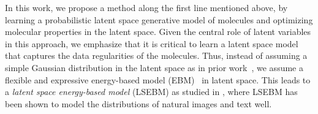\documentclass[accepted]{uai2023} %
\begin{document}
In this work, we propose a method along the first line mentioned above, by learning a probabilistic latent space generative model of molecules and optimizing molecular properties in the latent space. Given the central role of latent variables in this approach, we emphasize that it is critical to learn a latent space model that captures the data regularities of the molecules. Thus, instead of assuming a simple Gaussian distribution in the latent space as in prior work~\citep{gomez2018automatic, jin2018junction}, we assume a flexible and expressive energy-based model (EBM)~\citep{lecun2006tutorial,ngiam2011learning,kim2016deep,xie2016theory,kumar2019maximum,nijkamp2019learning,du2019implicit,grathwohl2019your,finn2016connection} in latent space. This leads to a \textit{latent space energy-based model} (LSEBM) as studied in \cite{pang2020learning,nie2021controllable}, where LSEBM has been shown to model the distributions of natural images and text well. %
\end{document}
